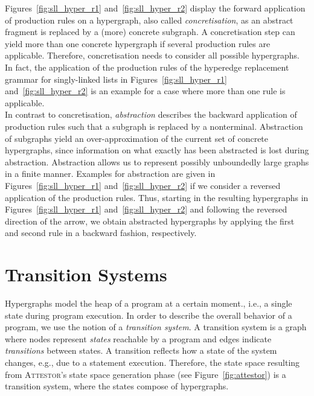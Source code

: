 \documentclass[a4paper, 12pt, twoside]{report}
\begin{document}
	Figures~\ref{fig:sll_hyper_r1} and~\ref{fig:sll_hyper_r2} display the forward application of production rules on a hypergraph, also called \textit{concretisation}, as an abstract fragment is replaced by a (more) concrete subgraph. A concretisation step can yield more than one concrete hypergraph if several production rules are applicable. Therefore, concretisation needs to consider all possible hypergraphs. In fact, the application of the production rules of the hyperedge replacement grammar for singly-linked lists in Figures~\ref{fig:sll_hyper_r1} and~\ref{fig:sll_hyper_r2} is an example for a case where more than one rule is applicable.\\
	
	In contrast to concretisation, \textit{abstraction} describes the backward application of production rules such that a subgraph is replaced by a nonterminal. Abstraction of subgraphs yield an over-approximation of the current set of concrete hypergraphs, since information on what exactly has been abstracted is lost during abstraction. Abstraction allows us to represent possibly unboundedly large graphs in a finite manner. Examples for abstraction are given in Figures~\ref{fig:sll_hyper_r1} and~\ref{fig:sll_hyper_r2} if we consider a reversed application of the production rules. Thus, starting in the resulting hypergraphs in Figures~\ref{fig:sll_hyper_r1} and~\ref{fig:sll_hyper_r2} and following the reversed direction of the arrow, we obtain abstracted hypergraphs by applying the first and second rule in a backward fashion, respectively.\\
	
	\section{Transition Systems}\label{sec:transition_system}
	
	Hypergraphs model the heap of a program at a certain moment., i.e., a single state during program execution. In order to describe the overall behavior of a program, we use the notion of a \textit{transition system}. A transition system is a graph where nodes represent \textit{states} reachable by a program and edges indicate \textit{transitions} between states. A transition reflects how a state of the system changes, e.g., due to a statement execution. Therefore, the state space resulting from \textsc{Attestor}'s state space generation phase (see Figure~\ref{fig:attestor}) is a transition system, where the states compose of hypergraphs.
	
\end{document}
